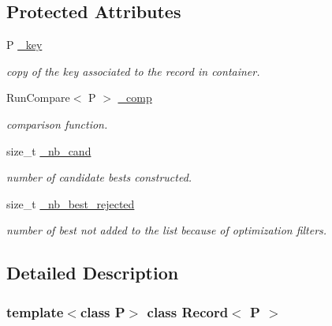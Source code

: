 \subsection*{Protected Attributes}
\begin{DoxyCompactItemize}
\item 
\mbox{\label{classRecord_abf6ea6cd82f35b05f70222bd3fdeefba}} 
P \mbox{\hyperlink{classRecord_abf6ea6cd82f35b05f70222bd3fdeefba}{\+\_\+key}}
\begin{DoxyCompactList}\small\item\em copy of the key associated to the record in container. \end{DoxyCompactList}\item 
\mbox{\label{classRecord_ab2357a1913c48fa519a7aff23026155f}} 
Run\+Compare$<$ P $>$ \mbox{\hyperlink{classRecord_ab2357a1913c48fa519a7aff23026155f}{\+\_\+comp}}
\begin{DoxyCompactList}\small\item\em comparison function. \end{DoxyCompactList}\item 
\mbox{\label{classRecord_a25d3afd2df62895c4768d6a520fd174a}} 
size\+\_\+t \mbox{\hyperlink{classRecord_a25d3afd2df62895c4768d6a520fd174a}{\+\_\+nb\+\_\+cand}}
\begin{DoxyCompactList}\small\item\em number of candidate bests constructed. \end{DoxyCompactList}\item 
\mbox{\label{classRecord_ac95357b0115df96cd4b5da99e973880d}} 
size\+\_\+t \mbox{\hyperlink{classRecord_ac95357b0115df96cd4b5da99e973880d}{\+\_\+nb\+\_\+best\+\_\+rejected}}
\begin{DoxyCompactList}\small\item\em number of best not added to the list because of optimization filters. \end{DoxyCompactList}\end{DoxyCompactItemize}


\subsection{Detailed Description}
\subsubsection*{template$<$class P$>$\newline
class Record$<$ P $>$}

